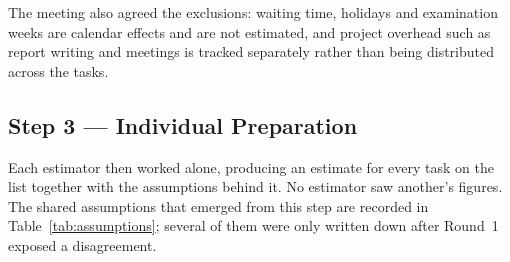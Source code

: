 \documentclass[11pt,a4paper]{report}
\begin{document}
The meeting also agreed the exclusions: waiting time, holidays and examination
weeks are calendar effects and are not estimated, and project overhead such as
report writing and meetings is tracked separately rather than being distributed
across the tasks.

\subsection{Step 3 --- Individual Preparation}

Each estimator then worked alone, producing an estimate for every task on the
list together with the assumptions behind it. No estimator saw another's figures.
The shared assumptions that emerged from this step are recorded in
Table~\ref{tab:assumptions}; several of them were only written down after Round~1
exposed a disagreement.
\end{document}
